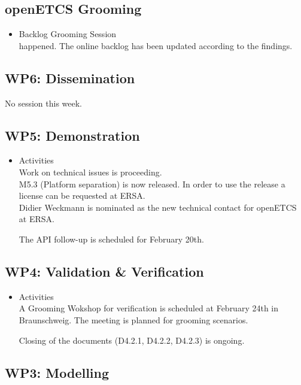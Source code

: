 \documentclass[a4paper, 11pt]{article}
\begin{document}
\subsection{openETCS Grooming}
\begin{itemize}
\item Backlog Grooming Session\\
happened. The online backlog has been updated according to the findings.
\end{itemize}

\subsection{WP6: Dissemination}
No session this week.

\subsection{WP5: Demonstration}
\begin{itemize}
\item Activities\\
Work on technical issues is proceeding.\\
M5.3 (Platform separation) is now released. In order to use the release a license can be requested at ERSA.\\
Didier Weckmann is nominated as the new technical contact for openETCS at ERSA. 

The API follow-up is scheduled for February 20th.

\end{itemize}

\subsection{WP4: Validation \& Verification}
\begin{itemize}
\item Activities\\
A Grooming Wokshop for verification is scheduled at February 24th in Braunschweig. The meeting is planned for grooming scenarios. 

Closing of the documents (D4.2.1, D4.2.2, D4.2.3) is ongoing. 

\end{itemize}

\subsection{WP3: Modelling}
\end{document}
